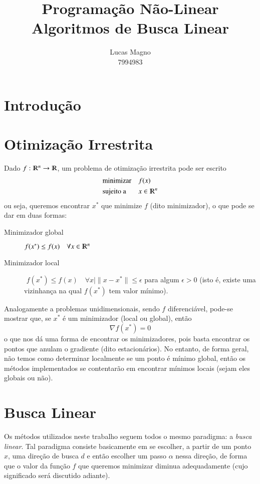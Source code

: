 \documentclass[a4paper,11pt]{article}
\date{}
\author{Lucas Magno \\ 7994983}
\title{Programação Não-Linear \\ Algoritmos de Busca Linear}
\begin{document}
    \maketitle

    \section*{Introdução}
    \section*{Otimização Irrestrita}
        Dado $f: \varmathbb{R}^n \rightarrow \varmathbb{R}$, um problema de
        otimização irrestrita pode ser escrito
        \begin{equation*}
            \begin{aligned}
                & \text{minimizar} & & f(x) \\
                & \text{sujeito a} & & x \in \varmathbb{R}^n \\
            \end{aligned}
        \end{equation*}
        ou seja, queremos encontrar $x^*$ que minimize $f$ (dito minimizador), o que pode se dar em duas formas:
        \begin{description}
            \item [Minimizador global] $f(x^*) \leq f(x) \quad  \forall x \in \varmathbb{R}^n$
            \item [Minimizador local]  $\,\,f(x^*) \leq f(x) \quad  \forall x \mid \|x - x^*\| \leq \epsilon$
                    para algum $\epsilon > 0$ (isto é, existe uma vizinhança na qual $f(x^*)$ tem valor mínimo).
        \end{description}

        Analogamente a problemas unidimensionais, sendo $f$ diferenciável, pode-se mostrar que, se $x^*$ é um minimizador
        (local ou global), então
            $$ \nabla f(x^*) = 0 $$
        o que nos dá uma forma de encontrar os minimizadores, pois basta encontrar os pontos que anulam o gradiente (dito estacionários).
        No entanto, de forma geral, não temos como determinar localmente se um ponto é mínimo global, então os métodos implementados se contentarão
        em encontrar mínimos locais (sejam eles globais ou não).

    \newpage
    \section*{Busca Linear}
        Os métodos utilizados neste trabalho seguem todos o mesmo paradigma: a \emph{busca linear}.
        Tal paradigma consiste basicamente em se escolher, a partir de um ponto $x$, uma direção de busca $d$ e então escolher
        um passo $\alpha$ nessa direção, de forma que o valor da função $f$ que queremos
        minimizar diminua adequadamente (cujo significado será discutido adiante).
\end{document}

